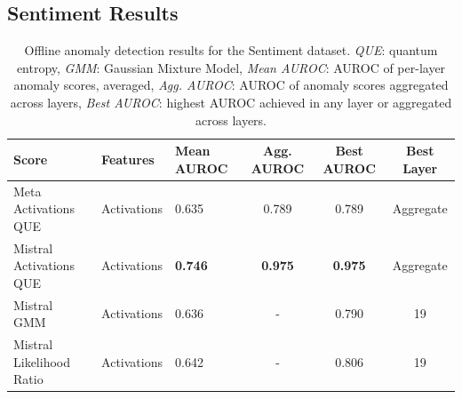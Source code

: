 

\subsection{Sentiment Results}

\begin{table}[H]
\centering
\scriptsize  %
\renewcommand{\arraystretch}{1.2}  %
\setlength{\tabcolsep}{2pt}  %
\begin{tabular}{lp{3cm}lccc}
\toprule
\textbf{Score} & \textbf{Features} & \textbf{Mean AUROC} & \textbf{Agg. AUROC} & \textbf{Best AUROC} & \textbf{Best Layer} \\
\midrule
Meta Activations QUE             & Activations & 0.635  & 0.789  & 0.789  & Aggregate \\ 
Mistral Activations QUE          & Activations & \textbf{0.746}  & \textbf{0.975}  & \textbf{0.975}  & Aggregate \\ 
Mistral GMM & Activations & 0.636  & -      & 0.790  & 19 \\ 
Mistral Likelihood Ratio         & Activations & 0.642  & -      & 0.806  & 19 \\ 
\bottomrule
\end{tabular}
\caption{ Offline anomaly detection results for the Sentiment dataset. \emph{QUE}: quantum entropy, \emph{GMM}: Gaussian Mixture Model, \emph{Mean AUROC}: AUROC of per-layer anomaly scores, averaged, \emph{Agg. AUROC}: AUROC of anomaly scores aggregated across layers, \emph{Best AUROC}: highest AUROC achieved in any layer or aggregated across layers.}
\label{tab:offline_anomaly_sentiment}
\end{table}



